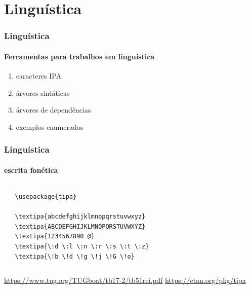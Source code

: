 \section{Linguística}

\begin{frame}[fragile]
\frametitle{Linguística}
\framesubtitle{Ferramentas para trabalhos em linguística}

\begin{enumerate}
    \item caracteres IPA
    \item árvores sintáticas
    \item árvores de dependências
    \item exemplos enumerados
\end{enumerate}

\end{frame}


\begin{frame}[fragile]
\frametitle{Linguística}
\framesubtitle{escrita fonética}
  \scriptsize
  \begin{columns}[c]
  \begin{verbatim}
   \usepackage{tipa}
   
   \textipa{abcdefghijklmnopqrstuvwxyz}
   \textipa{ABCDEFGHIJKLMNOPQRSTUVWXYZ}
   \textipa{1234567890 @}
   \textipa{\:d \:l \:n \:r \:s \:t \:z}
   \textipa{\!b \!d \!g \!j \!G \!o}
  \end{verbatim}
  \begin{fmpage}{\textwidth}
  \end{fmpage}
  \end{columns}

  \url{https://www.tug.org/TUGboat/tb17-2/tb51rei.pdf}
  \url{https://ctan.org/pkg/tipa}

\end{frame}


